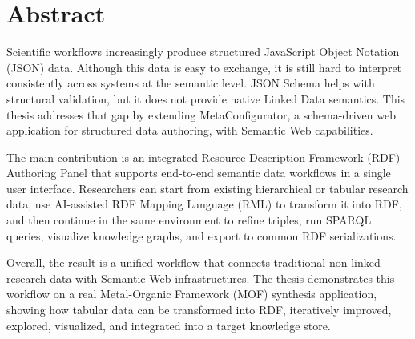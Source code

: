 \section*{Abstract}

Scientific workflows increasingly produce structured JavaScript Object Notation (JSON) data. Although this data is easy to exchange, it is still hard to interpret consistently across systems at the semantic level. JSON Schema helps with structural validation, but it does not provide native Linked Data semantics. This thesis addresses that gap by extending MetaConfigurator, a schema-driven web application for structured data authoring, with Semantic Web capabilities.

The main contribution is an integrated Resource Description Framework (RDF) Authoring Panel that supports end-to-end semantic data workflows in a single user interface. Researchers can start from existing hierarchical or tabular research data, use AI-assisted RDF Mapping Language (RML) to transform it into RDF, and then continue in the same environment to refine triples, run SPARQL queries, visualize knowledge graphs, and export to common RDF serializations.

Overall, the result is a unified workflow that connects traditional non-linked research data with Semantic Web infrastructures. The thesis demonstrates this workflow on a real Metal-Organic Framework (MOF) synthesis application, showing how tabular data can be transformed into RDF, iteratively improved, explored, visualized, and integrated into a target knowledge store.
